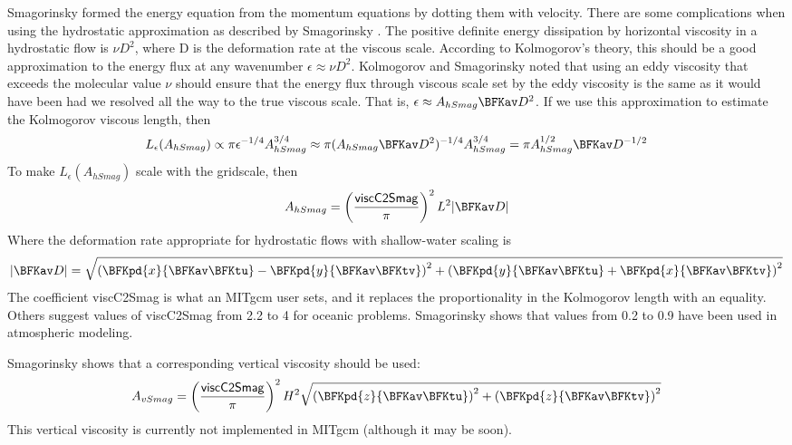 Smagorinsky formed the energy equation from the momentum equations by
dotting them with velocity.  There are some complications when using
the hydrostatic approximation as described by Smagorinsky
\cite{Smagorinsky93}.  The positive definite energy dissipation by
horizontal viscosity in a hydrostatic flow is $\nu D^2$, where D is
the deformation rate at the viscous scale.  According to Kolmogorov's
theory, this should be a good approximation to the energy flux at any
wavenumber $\epsilon\approx\nu D^2$.  Kolmogorov and Smagorinsky noted
that using an eddy viscosity that exceeds the molecular value $\nu$
should ensure that the energy flux through viscous scale set by the
eddy viscosity is the same as it would have been had we resolved all
the way to the true viscous scale.  That is, $\epsilon\approx
A_{hSmag} \BFKav D^2$.  If we use this approximation to estimate the
Kolmogorov viscous length, then
\begin{equation}
L_\epsilon(A_{hSmag})\propto\pi\epsilon^{-1/4}A_{hSmag}^{3/4}\approx\pi(A_{hSmag}
\BFKav D^2)^{-1/4}A_{hSmag}^{3/4} = \pi A_{hSmag}^{1/2}\BFKav D^{-1/2}
\end{equation}
To make $L_\epsilon(A_{hSmag})$ scale with the gridscale, then
\begin{equation}
A_{hSmag} = \left(\frac{{\sf viscC2Smag}}{\pi}\right)^2L^2|\BFKav D|
\end{equation}
Where the deformation rate appropriate for hydrostatic flows with
shallow-water scaling is
\begin{equation}
|\BFKav D|=\sqrt{\left(\BFKpd{x}{\BFKav \BFKtu}-\BFKpd{y}{\BFKav \BFKtv}\right)^2
+\left(\BFKpd{y}{\BFKav \BFKtu}+\BFKpd{x}{\BFKav \BFKtv}\right)^2}
\end{equation}
The coefficient {\sf viscC2Smag} is what an MITgcm user sets, and it
replaces the proportionality in the Kolmogorov length with an
equality.  Others \cite{grha00} suggest values of {\sf viscC2Smag}
from 2.2 to 4 for oceanic problems.  Smagorinsky \cite{Smagorinsky93}
shows that values from 0.2 to 0.9 have been used in atmospheric
modeling.

Smagorinsky \cite{Smagorinsky93} shows that a corresponding vertical
viscosity should be used:
\begin{equation}
A_{vSmag}=\left(\frac{{\sf viscC2Smag}}{\pi}\right)^2H^2
\sqrt{\left(\BFKpd{z}{\BFKav \BFKtu}\right)^2
+\left(\BFKpd{z}{\BFKav \BFKtv}\right)^2}
\end{equation}
This vertical viscosity is currently not implemented in MITgcm
(although it may be soon).

